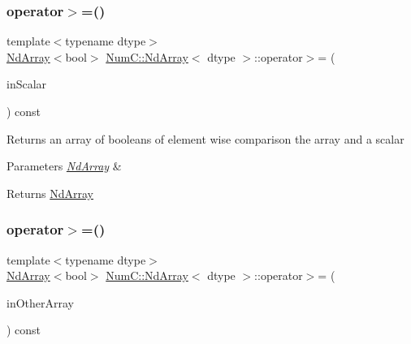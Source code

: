 \subsubsection{\texorpdfstring{operator$>$=()}{operator>=()}\hspace{0.1cm}{\footnotesize\ttfamily [1/2]}}
{\footnotesize\ttfamily template$<$typename dtype$>$ \\
\mbox{\hyperlink{class_num_c_1_1_nd_array}{Nd\+Array}}$<$bool$>$ \mbox{\hyperlink{class_num_c_1_1_nd_array}{Num\+C\+::\+Nd\+Array}}$<$ dtype $>$\+::operator$>$= (\begin{DoxyParamCaption}\item[{dtype}]{in\+Scalar }\end{DoxyParamCaption}) const\hspace{0.3cm}{\ttfamily [inline]}}

Returns an array of booleans of element wise comparison the array and a scalar


\begin{DoxyParams}{Parameters}
{\em \mbox{\hyperlink{class_num_c_1_1_nd_array}{Nd\+Array}}} & \\
\hline
\end{DoxyParams}
\begin{DoxyReturn}{Returns}
\mbox{\hyperlink{class_num_c_1_1_nd_array}{Nd\+Array}} 
\end{DoxyReturn}
\mbox{\label{class_num_c_1_1_nd_array_a954c60e9d86bf650cc4a58953fce1e59}} 
\subsubsection{\texorpdfstring{operator$>$=()}{operator>=()}\hspace{0.1cm}{\footnotesize\ttfamily [2/2]}}
{\footnotesize\ttfamily template$<$typename dtype$>$ \\
\mbox{\hyperlink{class_num_c_1_1_nd_array}{Nd\+Array}}$<$bool$>$ \mbox{\hyperlink{class_num_c_1_1_nd_array}{Num\+C\+::\+Nd\+Array}}$<$ dtype $>$\+::operator$>$= (\begin{DoxyParamCaption}\item[{const \mbox{\hyperlink{class_num_c_1_1_nd_array}{Nd\+Array}}$<$ dtype $>$ \&}]{in\+Other\+Array }\end{DoxyParamCaption}) const\hspace{0.3cm}{\ttfamily [inline]}}

